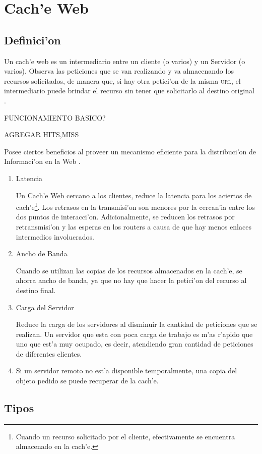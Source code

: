 \chapter{Cach'e Web}
\label{cache}
\section{Definici'on}

Un cach'e web es un intermediario entre un cliente (o varios) y un Servidor (o varios). Observa las peticiones que se van realizando y va almacenando los recursos solicitados, de manera que, si hay otra petici'on de la misma \textsc{url}, el intermediario puede brindar el recurso sin tener que solicitarlo al destino original \citep{cacheDef}.

FUNCIONAMIENTO BASICO?

AGREGAR HITS,MISS

Posee ciertos beneficios al proveer un mecanismo eficiente para la distribuci'on de Informaci'on en la Web \citep[p. 20]{webCaching}.
\begin{enumerate}
\item Latencia

Un Cach'e Web cercano a los clientes, reduce la latencia para los aciertos de cach'e\footnote{Cuando un recurso solicitado por el cliente, efectivamente se encuentra almacenado en la cach'e.}. Los retrasos en la transmisi'on son menores por la cercan'ia entre los dos puntos de interacci'on. Adicionalmente, se reducen los retrasos por retransmisi'on y las esperas en los routers a causa de que hay menos enlaces intermedios involucrados.
\item Ancho de Banda

Cuando se utilizan las copias de los recursos almacenados en la cach'e, se ahorra ancho de banda, ya que no hay que hacer la petici'on del recurso al destino final.
\item Carga del Servidor

Reduce la carga de los servidores al disminuir la cantidad de peticiones que se realizan. Un servidor que esta con poca carga de trabajo es m'as r'apido que uno que est'a muy ocupado, es decir, atendiendo gran cantidad de peticiones de diferentes clientes.

\item Si un servidor remoto no est'a disponible temporalmente, una copia del objeto pedido se puede recuperar de la cach'e.
\end{enumerate}

\section{Tipos}

